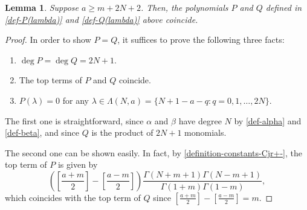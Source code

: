 \documentclass[10pt,a4paper]{amsart}
\newtheorem{lemma}{Lemma}
\begin{document}
\begin{lemma}\label{lemma-P=Q}
Suppose $a \geq m+2N+2$. Then, the polynomials $P$ and $Q$ defined in \eqref{def-P(lambda)} and \eqref{def-Q(lambda)} above coincide.
\end{lemma}

\begin{proof}
In order to show $P = Q$, it suffices to prove the following three facts:
\begin{enumerate}[label=\normalfont{(\arabic*)}]
\item $\deg P = \deg Q = 2N+1$.
\item The top terms of $P$ and $Q$ coincide.
\item $P(\lambda) = 0$ for any $\lambda \in \Lambda(N,a) = \{N+1-a-q: q=0, 1, \ldots, 2N\}$. 
\end{enumerate}
The first one is straightforward, since $\alpha$ and $\beta$ have degree $N$ by \eqref{def-alpha} and \eqref{def-beta}, and since $Q$ is the product of $2N+1$ monomials.

The second one can be shown easily. In fact, by \eqref{definition-constants-Cjr+-}, the top term of $P$ is given by
\begin{equation*}
\left(\left[\frac{a+m}{2}\right]-\left[\frac{a-m}{2}\right]\right)\frac{\Gamma(N+m+1)\Gamma(N-m+1)}{\Gamma(1+m)\Gamma(1-m)},
\end{equation*}
which coincides with the top term of $Q$ since $\left[\frac{a+m}{2}\right]-\left[\frac{a-m}{2}\right] = m$.


\end{proof}
\end{document}
